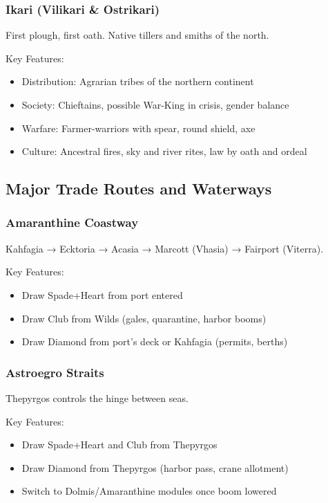 \subsubsection{Ikari (Vilikari \& Ostrikari)}
\label{sec:ikaripeoples}

First plough, first oath. Native tillers and smiths of the north.

Key Features:
\begin{itemize}
    \item Distribution: Agrarian tribes of the northern continent
    \item Society: Chieftains, possible War-King in crisis, gender balance
    \item Warfare: Farmer-warriors with spear, round shield, axe
    \item Culture: Ancestral fires, sky and river rites, law by oath and ordeal
\end{itemize}

\subsection{Major Trade Routes and Waterways}

\subsubsection{Amaranthine Coastway}
\label{sec:amaranthinecoastway}

Kahfagia → Ecktoria → Acasia → Marcott (Vhasia) → Fairport (Viterra).

Key Features:
\begin{itemize}
    \item Draw Spade+Heart from port entered
    \item Draw Club from Wilds (gales, quarantine, harbor booms)
    \item Draw Diamond from port's deck or Kahfagia (permits, berths)
\end{itemize}

\subsubsection{Astroegro Straits}
\label{sec:astroegrostraits}

Thepyrgos controls the hinge between seas.

Key Features:
\begin{itemize}
    \item Draw Spade+Heart and Club from Thepyrgos
    \item Draw Diamond from Thepyrgos (harbor pass, crane allotment)
    \item Switch to Dolmis/Amaranthine modules once boom lowered
\end{itemize}

